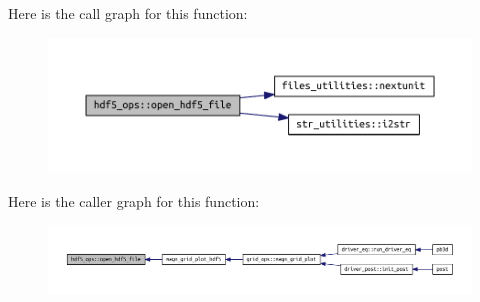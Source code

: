 Here is the call graph for this function\+:
\nopagebreak
\begin{figure}[H]
\begin{center}
\leavevmode
\includegraphics[width=350pt]{namespacehdf5__ops_a28cdecb45d88592a69dada6fd5ab9919_cgraph}
\end{center}
\end{figure}
Here is the caller graph for this function\+:
\nopagebreak
\begin{figure}[H]
\begin{center}
\leavevmode
\includegraphics[width=350pt]{namespacehdf5__ops_a28cdecb45d88592a69dada6fd5ab9919_icgraph}
\end{center}
\end{figure}
\mbox{\label{namespacehdf5__ops_ad794d069ca355f28536fba7e0d21bc13}} 
